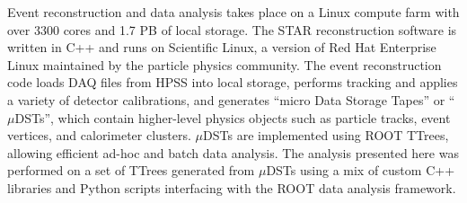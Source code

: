 Event reconstruction and data analysis takes place on a Linux compute farm with over 3300 cores and 1.7 PB of local storage.  The STAR reconstruction software  is written in C++ and runs on Scientific Linux, a version of Red Hat Enterprise Linux maintained by the particle physics community.  The event reconstruction code loads DAQ files from HPSS into local storage, performs tracking and applies a variety of detector calibrations, and generates ``micro Data Storage Tapes'' or ``$\mu$DSTs'', which contain higher-level physics objects such as particle tracks, event vertices, and calorimeter clusters.  $\mu$DSTs are implemented using ROOT \cite{Brun:1997pa} TTrees, allowing efficient ad-hoc and batch data analysis.  The analysis presented here was performed on a set of TTrees generated from $\mu$DSTs using a mix of custom C++ libraries and Python scripts interfacing with the ROOT data analysis framework.
